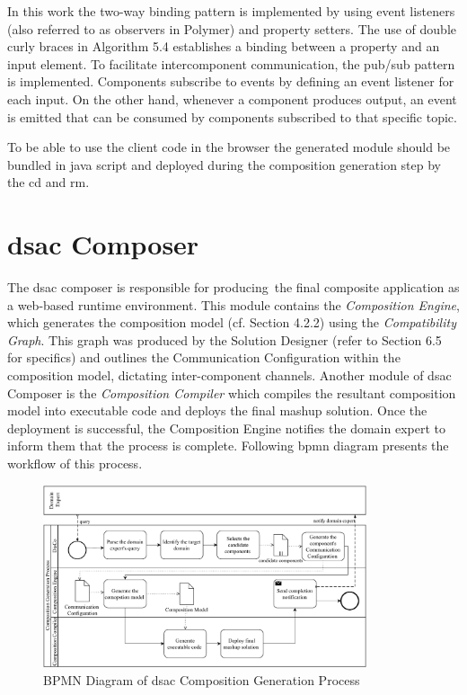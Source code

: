 In this work the two-way binding pattern is implemented by using event
listeners (also referred to as observers in Polymer) and property
setters. The use of double curly braces in Algorithm 5.4 establishes a binding between a property and
an input element.
To facilitate intercomponent communication, the pub/sub pattern is
implemented. Components subscribe to events by defining an event
listener for each input. On the other hand, whenever a component
produces output, an event is emitted that can be consumed by components
subscribed to that specific topic.

To be able to use the client code in the browser the generated module
should be bundled in java script and deployed during the composition
generation step by the \gls{cd} and \gls{rm}.

\hypertarget{sec:dsac-composer}{%
\section{\gls{dsac} Composer}\label{sec:dsac-composer}}
\vspace{15pt}

The \gls{dsac} composer is responsible for producing~the final composite
application as a web-based runtime environment. This module contains
the \emph{Composition Engine}, which generates the composition model
(cf. Section 4.2.2) using the \emph{Compatibility Graph}. This graph was
produced by the Solution Designer (refer to Section 6.5 for specifics)
and outlines the Communication Configuration within the composition
model, dictating inter-component channels. Another module of \gls{dsac}
Composer is the \emph{Composition Compiler} which compiles the resultant
composition model into executable code and deploys the final mashup
solution. Once the deployment is successful, the Composition Engine
notifies the domain expert to inform them that the process is complete.
Following \gls{bpmn} diagram presents the workflow of this process.

\begin{figure}[hbt]
\hypertarget{fig:composition-gen}{%
\centering
\includegraphics[width=0.85\textwidth]{../figures/MyFigures/CompositionBPMN.drawio.pdf}
\captionsetup{justification=centering}
\caption{BPMN Diagram of \gls{dsac} Composition Generation Process}\label{fig:composition-gen}
}
\end{figure}

